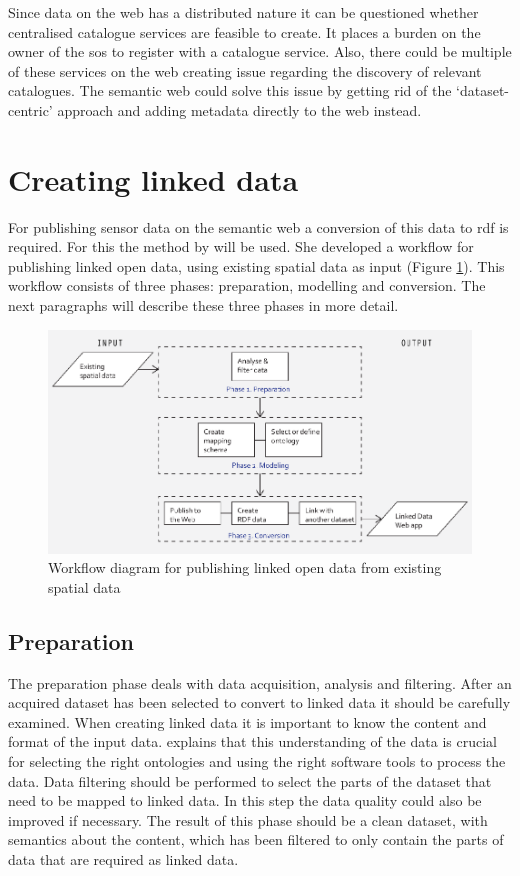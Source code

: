 Since data on the web has a distributed nature it can be questioned whether centralised catalogue services are feasible to create. It places a burden on the owner of the \ac{sos} to register with a catalogue service. Also, there could be multiple of these services on the web creating issue regarding the discovery of relevant catalogues. The semantic web could solve this issue by getting rid of the `dataset-centric' approach and adding metadata directly to the web instead.

\section{Creating linked data}
For publishing sensor data on the semantic web a conversion of this data to \ac{rdf} is required. For this the method by \cite{LD:Missier} will be used. She developed a workflow for publishing linked open data, using existing spatial data as input (Figure \ref{fig:missier}). This workflow consists of three phases: preparation, modelling and conversion. The next paragraphs will describe these three phases in more detail.

\begin{figure}
	\centering
	\includegraphics[width=1\linewidth]{UML/workflowMissier.png}
	\caption{Workflow diagram for publishing linked open data from existing spatial data \citep[p. 28]{LD:Missier}}
	\label{fig:missier}
\end{figure}

\subsection{Preparation}
The preparation phase deals with data acquisition, analysis and filtering. After an acquired dataset has been selected to convert to linked data it should be carefully examined. When creating linked data it is important to know the content and format of the input data. \cite{LD:Missier} explains that this understanding of the data is crucial for selecting the right ontologies and using the right software tools to process the data. Data filtering should be performed to select the parts of the dataset that need to be mapped to linked data. In this step the data quality could also be improved if necessary. The result of this phase should be a clean dataset, with semantics about the content, which has been filtered to only contain the parts of data that are required as linked data. 
 
